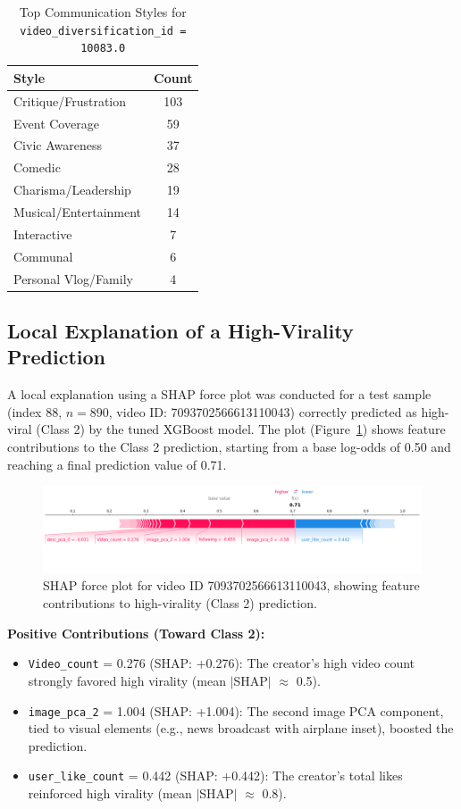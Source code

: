 \documentclass[12pt,a4paper]{report}
\begin{document}
\begin{table}[h]
    \centering
    \caption{Top Communication Styles for \texttt{video\_diversification\_id = 10083.0}}
    \label{tab:comm_styles_10083}
    \begin{tabular}{l c}
        \toprule
        \textbf{Style} & \textbf{Count} \\
        \midrule
        Critique/Frustration & 103 \\
        Event Coverage & 59 \\
        Civic Awareness & 37 \\
        Comedic & 28 \\
        Charisma/Leadership & 19 \\
        Musical/Entertainment & 14 \\
        Interactive & 7 \\
        Communal & 6 \\
        Personal Vlog/Family & 4 \\
        \bottomrule
    \end{tabular}
\end{table}
\newpage
\subsection{Local Explanation of a High-Virality Prediction}
A local explanation using a SHAP force plot was conducted for a test sample (index 88, $n=890$, video ID: 7093702566613110043) correctly predicted as high-viral (Class 2) by the tuned XGBoost model. The plot (Figure~\ref{fig:shap_force_plot}) shows feature contributions to the Class 2 prediction, starting from a base log-odds of 0.50 and reaching a final prediction value of 0.71.

\begin{figure}[h]
    \centering
    \includegraphics[width=\linewidth]{figures/RQ1/shap_force_plot.png}
    \caption{SHAP force plot for video ID 7093702566613110043, showing feature contributions to high-virality (Class 2) prediction.}
    \label{fig:shap_force_plot}
\end{figure}

\textbf{Positive Contributions (Toward Class 2):}
\begin{itemize}
    \item \texttt{Video\_count} = 0.276 (SHAP: +0.276): The creator’s high video count strongly favored high virality (mean $|$SHAP$|$ $\approx$ 0.5).
    \item \texttt{image\_pca\_2} = 1.004 (SHAP: +1.004): The second image PCA component, tied to visual elements (e.g., news broadcast with airplane inset), boosted the prediction.
    \item \texttt{user\_like\_count} = 0.442 (SHAP: +0.442): The creator’s total likes reinforced high virality (mean $|$SHAP$|$ $\approx$ 0.8).
\end{itemize}
\end{document}
